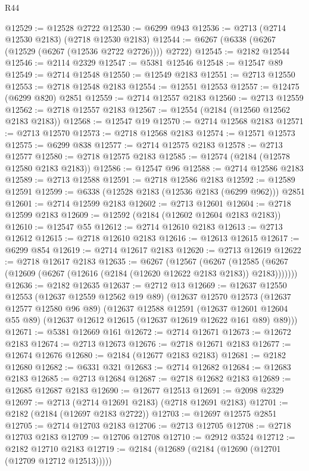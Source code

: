 \begin{lexlean}{R44}
\begin{coremodule}
@12529 := @12528 @2722
@12530 := @6299 @943
@12536 := @2713 (@2714 @12530 @2183) (@2718 @12530 @2183)
@12544 := @6267 (@6338 (@6267 (@12529 (@6267 (@12536 @2722 @2726)))) @2722)
@12545 := @2182 @12544
@12546 := @2114 @2329
@12547 := @5381 @12546
@12548 := @12547 @89
@12549 := @2714 @12548
@12550 := @12549 @2183
@12551 := @2713 @12550
@12553 := @2718 @12548 @2183
@12554 := @12551 @12553
@12557 := @12475 (@6299 @820) @2851
@12559 := @2714 @12557 @2183
@12560 := @2713 @12559
@12562 := @2718 @12557 @2183
@12567 := @12554 (@2184 (@12560 @12562 @2183 @2183))
@12568 := @12547 @19
@12570 := @2714 @12568 @2183
@12571 := @2713 @12570
@12573 := @2718 @12568 @2183
@12574 := @12571 @12573
@12575 := @6299 @838
@12577 := @2714 @12575 @2183
@12578 := @2713 @12577
@12580 := @2718 @12575 @2183
@12585 := @12574 (@2184 (@12578 @12580 @2183 @2183))
@12586 := @12547 @96
@12588 := @2714 @12586 @2183
@12589 := @2713 @12588
@12591 := @2718 @12586 @2183
@12592 := @12589 @12591
@12599 := @6338 (@12528 @2183 (@12536 @2183 (@6299 @962))) @2851
@12601 := @2714 @12599 @2183
@12602 := @2713 @12601
@12604 := @2718 @12599 @2183
@12609 := @12592 (@2184 (@12602 @12604 @2183 @2183))
@12610 := @12547 @55
@12612 := @2714 @12610 @2183
@12613 := @2713 @12612
@12615 := @2718 @12610 @2183
@12616 := @12613 @12615
@12617 := @6299 @854
@12619 := @2714 @12617 @2183
@12620 := @2713 @12619
@12622 := @2718 @12617 @2183
@12635 := @6267
    (@12567
      (@6267 (@12585 (@6267 (@12609 (@6267 (@12616 (@2184 (@12620 @12622 @2183 @2183)) @2183)))))))
@12636 := @2182 @12635
@12637 := @2712 @13
@12669 := @12637
    @12550
    @12553
    (@12637 @12559 @12562 @19 @89)
    (@12637
      @12570
      @12573
      (@12637 @12577 @12580 @96 @89)
      (@12637
        @12588
        @12591
        (@12637 @12601 @12604 @55 @89)
        (@12637 @12612 @12615 (@12637 @12619 @12622 @161 @89) @89)))
@12671 := @5381 @12669 @161
@12672 := @2714 @12671
@12673 := @12672 @2183
@12674 := @2713 @12673
@12676 := @2718 @12671 @2183
@12677 := @12674 @12676
@12680 := @2184 (@12677 @2183 @2183)
@12681 := @2182 @12680
@12682 := @6331 @321
@12683 := @2714 @12682
@12684 := @12683 @2183
@12685 := @2713 @12684
@12687 := @2718 @12682 @2183
@12689 := @12685 @12687 @2183
@12690 := @12677 @12513
@12691 := @2098 @2329
@12697 := @2713 (@2714 @12691 @2183) (@2718 @12691 @2183)
@12701 := @2182 (@2184 (@12697 @2183 @2722))
@12703 := @12697 @12575 @2851
@12705 := @2714 @12703 @2183
@12706 := @2713 @12705
@12708 := @2718 @12703 @2183
@12709 := @12706 @12708
@12710 := @2912 @3524
@12712 := @2182 @12710 @2183
@12719 := @2184 (@12689 (@2184 (@12690 (@12701 (@12709 @12712 @12513)))))

\end{coremodule}
\end{lexlean}

